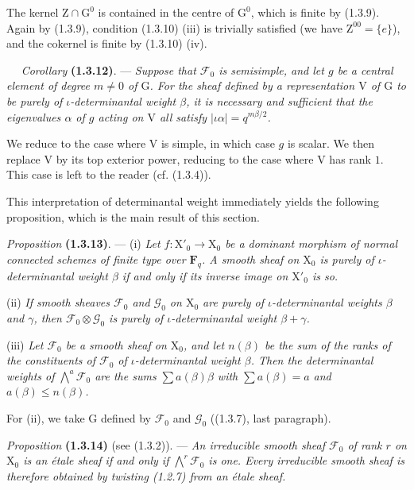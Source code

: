 \documentclass[11pt,leqno]{article}
\newcommand{\Page}[1]{\ifvmode\noindent\else\unskip\ \fi{\footnotesize\textcolor{gray}{[p.\,#1]}}\ \ignorespaces}
\begin{document}
The kernel \(\mathrm{Z}\cap\mathrm{G}^0\) is contained in the centre of \(\mathrm{G}^0\), which is finite by (1.3.9). Again by (1.3.9), condition (1.3.10) (iii) is trivially satisfied (we have \(\mathrm{Z}^{00}=\{e\}\)), and the cokernel is finite by (1.3.10) (iv).

\Page{161}
\textit{Corollary} \textbf{(1.3.12)}. — \textit{Suppose that \(\mathcal{F}_0\) is semisimple, and let \(g\) be a central element of degree \(m\ne0\) of \(\mathrm{G}\). For the sheaf defined by a representation \(\mathrm{V}\) of \(\mathrm{G}\) to be purely of \(\iota\)-determinantal weight \(\beta\), it is necessary and sufficient that the eigenvalues \(\alpha\) of \(g\) acting on \(\mathrm{V}\) all satisfy \(|\iota\alpha|=q^{m\beta/2}\).}

We reduce to the case where \(\mathrm{V}\) is simple, in which case \(g\) is scalar. We then replace \(\mathrm{V}\) by its top exterior power, reducing to the case where \(\mathrm{V}\) has rank \(1\). This case is left to the reader (cf. (1.3.4)).

This interpretation of determinantal weight immediately yields the following proposition, which is the main result of this section.

\textit{Proposition} \textbf{(1.3.13)}. — (i) \textit{Let \(f:\mathrm{X}'_0\to\mathrm{X}_0\) be a dominant morphism of normal connected schemes of finite type over \(\mathbf{F}_q\). A smooth sheaf on \(\mathrm{X}_0\) is purely of \(\iota\)-determinantal weight \(\beta\) if and only if its inverse image on \(\mathrm{X}'_0\) is so.}

(ii) \textit{If smooth sheaves \(\mathcal{F}_0\) and \(\mathcal{G}_0\) on \(\mathrm{X}_0\) are purely of \(\iota\)-determinantal weights \(\beta\) and \(\gamma\), then \(\mathcal{F}_0\otimes\mathcal{G}_0\) is purely of \(\iota\)-determinantal weight \(\beta+\gamma\).}

(iii) \textit{Let \(\mathcal{F}_0\) be a smooth sheaf on \(\mathrm{X}_0\), and let \(n(\beta)\) be the sum of the ranks of the constituents of \(\mathcal{F}_0\) of \(\iota\)-determinantal weight \(\beta\). Then the determinantal weights of \(\bigwedge\limits^a\mathcal{F}_0\) are the sums \(\sum a(\beta)\beta\) with \(\sum a(\beta)=a\) and \(a(\beta)\le n(\beta)\).}

For (ii), we take \(\mathrm{G}\) defined by \(\mathcal{F}_0\) and \(\mathcal{G}_0\) ((1.3.7), last paragraph).

\textit{Proposition} \textbf{(1.3.14)} (see (1.3.2)). — \textit{An irreducible smooth sheaf \(\mathcal{F}_0\) of rank \(r\) on \(\mathrm{X}_0\) is an étale sheaf if and only if \(\bigwedge\limits^r\mathcal{F}_0\) is one. Every irreducible smooth sheaf is therefore obtained by twisting \textup{(1.2.7)} from an étale sheaf.}
\end{document}
